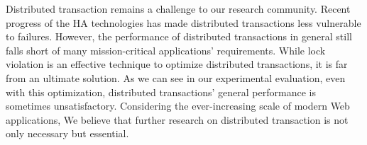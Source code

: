 \documentclass[conference]{IEEEtran}
\begin{document}
Distributed transaction remains a challenge to our research community. Recent progress of the HA technologies has made distributed transactions less vulnerable to failures.
However, the performance of distributed transactions in general still falls short of many mission-critical applications' requirements.
While lock violation is an effective technique to optimize distributed transactions, it is far from an ultimate solution.
As we can see in our experimental evaluation, even with this optimization, distributed transactions' general performance is sometimes unsatisfactory.
Considering the ever-increasing scale of modern Web applications, We believe that further research on distributed transaction is not only necessary but essential.



\end{document}
